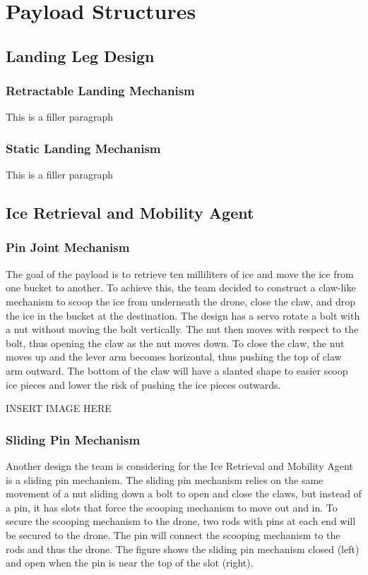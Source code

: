 \section{Payload Structures}\label{PL:Deployment:Structures}
	\subsection{Landing Leg Design}
		\subsubsection{Retractable Landing Mechanism}
			This is a filler paragraph

		\subsubsection{Static Landing Mechanism}
			This is a filler paragraph

	\subsection{Ice Retrieval and Mobility Agent}
		\subsubsection{Pin Joint Mechanism}
			The goal of the payload is to retrieve ten milliliters of ice and move the ice from one bucket to another. To achieve this, the team decided to construct a claw-like mechanism to scoop the ice from underneath the drone, close the claw, and drop the ice in the bucket at the destination. The design has a servo rotate a bolt with a nut without moving the bolt vertically. The nut then moves with respect to the bolt, thus opening the claw as the nut moves down. To close the claw, the nut moves up and the lever arm becomes horizontal, thus pushing the top of claw arm outward. The bottom of the claw will have a slanted shape to easier scoop ice pieces and lower the risk of pushing the ice pieces outwards. 

			INSERT IMAGE HERE

		\subsubsection{Sliding Pin Mechanism}
			Another design the team is considering for the Ice Retrieval and Mobility Agent is a sliding pin mechanism. The sliding pin mechanism relies on the same movement of a nut sliding down a bolt to open and close the claws, but instead of a pin, it has slots that force the scooping mechanism to move out and in. To secure the scooping mechanism to the drone, two rods with pins at each end will be secured to the drone. The pin will connect the scooping mechanism to the rods and thus the drone. The figure shows the sliding pin mechanism closed (left) and open when the pin is near the top of the slot (right). 

